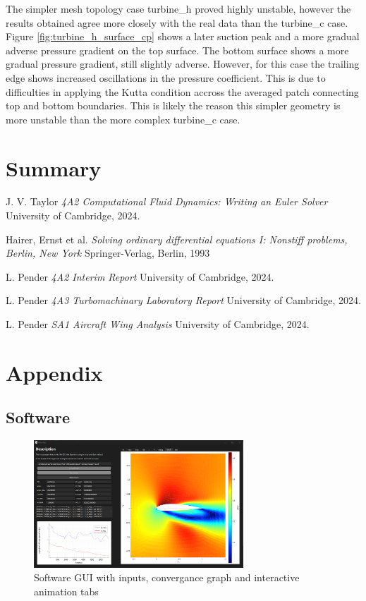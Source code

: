 \documentclass{article}
\begin{document}
The simpler mesh topology case turbine\_h proved highly unstable, however the results obtained agree more closely with the real data than the turbine\_c case.
Figure \ref{fig:turbine_h_surface_cp} shows a later suction peak and a more gradual adverse pressure gradient on the top surface.
The bottom surface shows a more gradual pressure gradient, still slightly adverse.
However, for this case the trailing edge shows increased oscillations in the pressure coefficient.
This is due to difficulties in applying the Kutta condition accross the averaged patch connecting top and bottom boundaries.
This is likely the reason this simpler geometry is more unstable than the more complex turbine\_c case.


\section{Summary}

\begin{thebibliography}{9}

    J. V. Taylor
    \emph{4A2 Computational Fluid Dynamics: Writing an Euler Solver}
    University of Cambridge,
    2024.

    Hairer, Ernst et al.
    \emph{Solving ordinary differential equations I: Nonstiff problems, Berlin, New York}
    Springer-Verlag, Berlin, 1993

    L. Pender
    \emph{4A2 Interim Report}
    University of Cambridge,
    2024.

    L. Pender
    \emph{4A3 Turbomachinary Laboratory Report}
    University of Cambridge,
    2024.

    L. Pender
    \emph{SA1 Aircraft Wing Analysis}
    University of Cambridge,
    2024.
  
\end{thebibliography}

\section{Appendix}

\subsection{Software}

\begin{figure}[H]
    \centering
    \includegraphics[width=0.7\textwidth]{figures/software.png}
    \caption{Software GUI with inputs, convergance graph and interactive animation tabs}
    \label{fig:software}
\end{figure}
\end{document}
